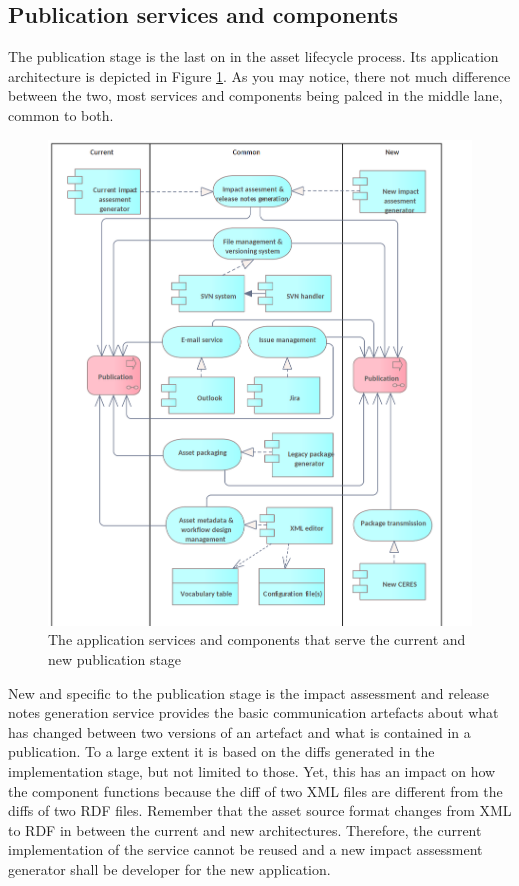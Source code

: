 	
	\subsection{Publication services and components}
	\label{sec:publication-application}	
	
	The publication stage is the last on in the asset lifecycle process. Its application architecture is depicted in Figure \ref{fig:application-publication}. As you may notice, there not much difference between the two, most services and components being palced in the middle lane, common to both. 
	
	\begin{figure}[!h]
		\centering
		\includegraphics[width=.9\textwidth]{images/application/Publication v3.png}
		\caption{The application services and components that serve the current and new publication stage}
		\label{fig:application-publication}
	\end{figure}

	New and specific to the publication stage is the impact assessment and release notes generation service provides the basic communication artefacts about what has changed between two versions of an artefact and what is contained in a publication. To a large extent it is based on the diffs generated in the implementation stage, but not limited to those. Yet, this has an impact on how the component functions because the diff of two XML files are different from the diffs of two RDF files. Remember that the asset source format changes from XML to RDF in between the current and new architectures. Therefore, the current implementation of the service cannot be reused and a new impact assessment generator shall be developer for the new application. 

